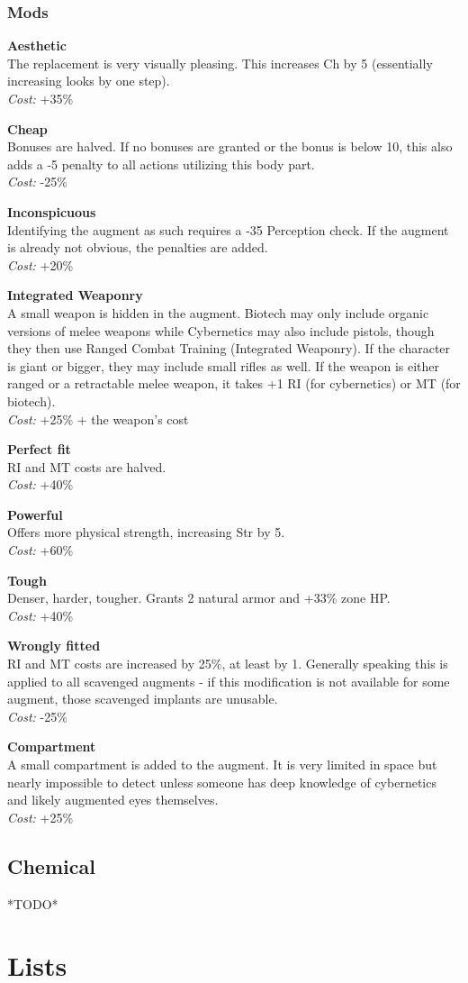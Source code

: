 \documentclass[12pt,a4paper,openany]{book}
\newcommand{\augmod}[3]{
	\begin{minipage}{\textwidth}
		\textbf{#1}\\
		#2\\
		\textit{Cost:} #3
	\end{minipage}
	\par
}
\begin{document}
	\subsection{Mods}
	\augmod{Aesthetic}{The replacement is very visually pleasing. This increases Ch by 5 (essentially increasing looks by one step).}{+35\%}
	\augmod{Cheap}{Bonuses are halved. If no bonuses are granted or the bonus is below 10, this also adds a -5 penalty to all actions utilizing this body part.}{-25\%}
	\augmod{Inconspicuous}{Identifying the augment as such requires a -35 Perception check. If the augment is already not obvious, the penalties are added.}{+20\%}
	\augmod{Integrated Weaponry}{A small weapon is hidden in the augment. Biotech may only include organic versions of melee weapons while Cybernetics may also include pistols, though they then use Ranged Combat Training (Integrated Weaponry). If the character is giant or bigger, they may include small rifles as well. If the weapon is either ranged or a retractable melee weapon, it takes +1 RI (for cybernetics) or MT (for biotech).}{+25\% + the weapon's cost}
	\augmod{Perfect fit}{RI and MT costs are halved.}{+40\%}
	\augmod{Powerful}{Offers more physical strength, increasing Str by 5.}{+60\%}
	\augmod{Tough}{Denser, harder, tougher. Grants 2 natural armor and +33\% zone HP.}{+40\%}
	\augmod{Wrongly fitted}{RI and MT costs are increased by 25\%, at least by 1. Generally speaking this is applied to all scavenged augments - if this modification is not available for some augment, those scavenged implants are unusable.}{-25\%}
	\augmod{Compartment}{A small compartment is added to the augment. It is very limited in space but nearly impossible to detect unless someone has deep knowledge of cybernetics and likely augmented eyes themselves.}{+25\%}
	\section{Chemical}
	*TODO*
	
	\chapter{Lists}
\end{document}
